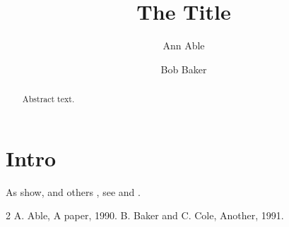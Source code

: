 \documentclass[agupp]{aguplus}
\begin{document}
\title{The Title}
\author{Ann Able}
\author{Bob Baker}
\begin{abstract}
Abstract text.
\end{abstract}
\section{Intro}
As \citet{key1} show, and others \citep{key2}, see \cite[][]{key1} and \cite[see][p.~2]{key2}.
\begin{thebibliography}{2}
 A. Able, A paper, 1990.
 B. Baker and C. Cole, Another, 1991.
\end{thebibliography}
\end{document}
